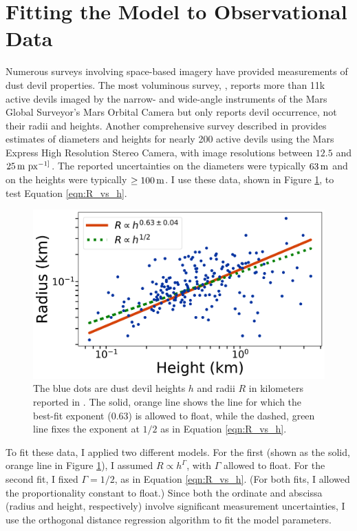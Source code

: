 \documentclass{aastex63}
\begin{document}
\section{Fitting the Model to Observational Data}
\label{sec:fitting}
Numerous surveys involving space-based imagery have provided measurements of dust devil properties. The most voluminous survey, \citet{2006JGRE..11112002C}, reports more than 11k active devils imaged by the narrow- and wide-angle instruments of the Mars Global Surveyor's Mars Orbital Camera but only reports devil occurrence, not their radii and heights. Another comprehensive survey described in \citet{2008Icar..197...39S} provides estimates of diameters and heights for nearly 200 active devils using the Mars Express High Resolution Stereo Camera, with image resolutions between $12.5$ and $25\,{\rm m\ px^{-1]}}$. The reported uncertainties on the diameters were typically $63\,{\rm m}$ and on the heights were typically $\ge 100\,{\rm m}$. I use these data, shown in Figure \ref{fig:Fit_to_Stanzel_data}, to test Equation \ref{eqn:R_vs_h}.

\begin{figure}
    \centering
    \includegraphics[width=\textwidth]{Fit_to_Stanzel_data.png}
    \caption{The blue dots are dust devil heights $h$ and radii $R$ in kilometers reported in \citet{2008Icar..197...39S}. The solid, orange line shows the line for which the best-fit exponent (0.63) is allowed to float, while the dashed, green line fixes the exponent at $1/2$ as in Equation \ref{eqn:R_vs_h}.}
    \label{fig:Fit_to_Stanzel_data}
\end{figure}

To fit these data, I applied two different models. For the first (shown as the solid, orange line in Figure \ref{fig:Fit_to_Stanzel_data}), I assumed $R \propto h^\Gamma$, with $\Gamma$ allowed to float. For the second fit, I fixed $\Gamma = 1/2$, as in Equation \ref{eqn:R_vs_h}. (For both fits, I allowed the proportionality constant to float.) Since both the ordinate and abscissa (radius and height, respectively) involve significant measurement uncertainties, I use the orthogonal distance regression algorithm \citep{odrref, scipy} to fit the model parameters.
\end{document}
